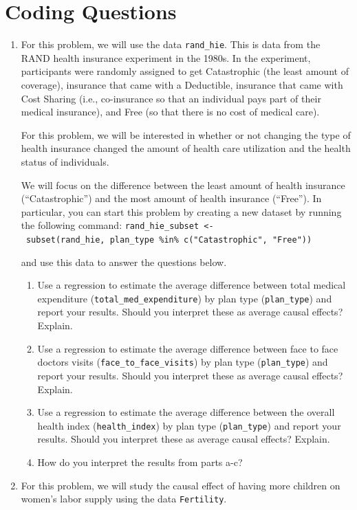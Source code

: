 \documentclass[
  letterpaper,
  DIV=11,
  numbers=noendperiod]{scrreprt}
\begin{document}
\section{Coding Questions}\label{coding-questions-4}

\begin{enumerate}
\def\labelenumi{\arabic{enumi}.}
\item
  For this problem, we will use the data \texttt{rand\_hie}. This is
  data from the RAND health insurance experiment in the 1980s. In the
  experiment, participants were randomly assigned to get Catastrophic
  (the least amount of coverage), insurance that came with a Deductible,
  insurance that came with Cost Sharing (i.e., co-insurance so that an
  individual pays part of their medical insurance), and Free (so that
  there is no cost of medical care).

  For this problem, we will be interested in whether or not changing the
  type of health insurance changed the amount of health care utilization
  and the health status of individuals.

  We will focus on the difference between the least amount of health
  insurance (``Catastrophic'') and the most amount of health insurance
  (``Free''). In particular, you can start this problem by creating a
  new dataset by running the following command:
  \texttt{rand\_hie\_subset\ \textless{}-\ subset(rand\_hie,\ plan\_type\ \%in\%\ c("Catastrophic",\ "Free"))}

  and use this data to answer the questions below.

  \begin{enumerate}
  \def\labelenumii{\alph{enumii})}
  \item
    Use a regression to estimate the average difference between total
    medical expenditure (\texttt{total\_med\_expenditure}) by plan type
    (\texttt{plan\_type}) and report your results. Should you interpret
    these as average causal effects? Explain.
  \item
    Use a regression to estimate the average difference between face to
    face doctors visits (\texttt{face\_to\_face\_visits}) by plan type
    (\texttt{plan\_type}) and report your results. Should you interpret
    these as average causal effects? Explain.
  \item
    Use a regression to estimate the average difference between the
    overall health index (\texttt{health\_index}) by plan type
    (\texttt{plan\_type}) and report your results. Should you interpret
    these as average causal effects? Explain.
  \item
    How do you interpret the results from parts a-c?
  \end{enumerate}
\item
  For this problem, we will study the causal effect of having more
  children on women's labor supply using the data \texttt{Fertility}.


\end{enumerate}
\end{document}
